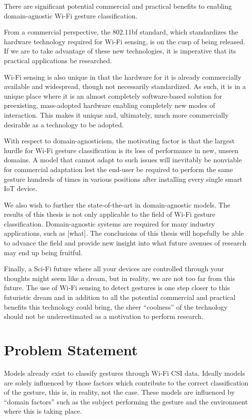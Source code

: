 There are significant potential commercial and practical benefits to enabling domain-agnostic Wi-Fi gesture classification.

From a commercial perspective, the 802.11bf standard, which standardizes the hardware technology required for Wi-Fi sensing, is on the cusp of being released.
If we are to take advantage of these new technologies, it is imperative that its practical applications be researched. 

Wi-Fi sensing is also unique in that the hardware for it is already commercially available and widespread, though not necessarily standardized.
As such, it is in a unique place where it is an almost completely software-based solution for preexisting, mass-adopted hardware enabling completely new modes of interaction.
This makes it unique and, ultimately, much more commercially desirable as a technology to be adopted.

With respect to domain-agnosticism, the motivating factor is that the largest hurdle for Wi-Fi gesture classification is its loss of performance in new, unseen domains.
A model that cannot adapt to such issues will inevitably be nonviable for commercial adaptation lest the end-user be required to perform the same gesture hundreds of times in various positions after installing every single smart IoT device.

We also wish to further the state-of-the-art in domain-agnostic models.
The results of this thesis is not only applicable to the field of Wi-Fi gesture classification.
Domain-agnostic systems are required for many industry applications, such as [what]. 
The conclusions of this thesis will hopefully be able to advance the field and provide new insight into what future avenues of research may end up being fruitful.

Finally, a Sci-Fi future where all your devices are controlled through your thoughts might seem like a dream, but in reality, we are not too far from this future.
The use of Wi-Fi sensing to detect gestures is one step closer to this futuristic dream and in addition to all the potential commercial and practical benefits this technology could bring, the sheer ``coolness'' of the technology should not be underestimated as a motivation to perform research. 

\section{Problem Statement}\label{sec:intro-problem-statement}
Models already exist to classify gestures through Wi-Fi CSI data.
Ideally models are solely influenced by those factors which contribute to the correct classification of the gesture, this is, in reality, not the case.
These models are influenced by ``domain factors'' such as the subject performing the gesture and the environment where this is taking place.

